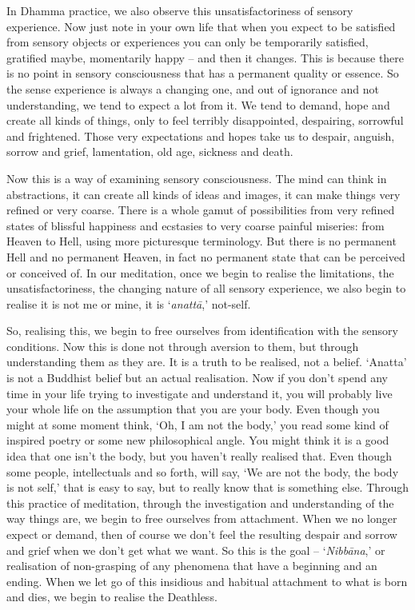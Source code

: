 In Dhamma practice, we also observe this unsatisfactoriness of sensory experience. Now just note in your own life that when you expect to be satisfied from sensory objects or experiences you can only be temporarily satisfied, gratified maybe, momentarily happy -- and then it changes. This is because there is no point in sensory consciousness that has a permanent quality or essence. So the sense experience is always a changing one, and out of ignorance and not understanding, we tend to expect a lot from it. We tend to demand, hope and create all kinds of things, only to feel terribly disappointed, despairing, sorrowful and frightened. Those very expectations and hopes take us to despair, anguish, sorrow and grief, lamentation, old age, sickness and death.

Now this is a way of examining sensory consciousness. The mind can think in abstractions, it can create all kinds of ideas and images, it can make things very refined or very coarse. There is a whole gamut of possibilities from very refined states of blissful happiness and ecstasies to very coarse painful miseries: from Heaven to Hell, using more picturesque terminology. But there is no permanent Hell and no permanent Heaven, in fact no permanent state that can be perceived or conceived of. In our meditation, once we begin to realise the limitations, the unsatisfactoriness, the changing nature of all sensory experience, we also begin to realise it is not me or mine, it is `\textit{anatt\=a},' not-self.

So, realising this, we begin to free ourselves from identification with the sensory conditions. Now this is done not through aversion to them, but through understanding them as they are. It is a truth to be realised, not a belief. `Anatta' is not a Buddhist belief but an actual realisation. Now if you don't spend any time in your life trying to investigate and understand it, you will probably live your whole life on the assumption that you are your body. Even though you might at some moment think, `Oh, I am not the body,' you read some kind of inspired poetry or some new philosophical angle. You might think it is a good idea that one isn't the body, but you haven't really realised that. Even though some people, intellectuals and so forth, will say, `We are not the body, the body is not self,' that is easy to say, but to really know that is something else. Through this practice of meditation, through the investigation and understanding of the way things are, we begin to free ourselves from attachment. When we no longer expect or demand, then of course we don't feel the resulting despair and sorrow and grief when we don't get what we want. So this is the goal -- `\textit{Nibb\=ana},' or realisation of non-grasping of any phenomena that have a beginning and an ending. When we let go of this insidious and habitual attachment to what is born and dies, we begin to realise the Deathless.

